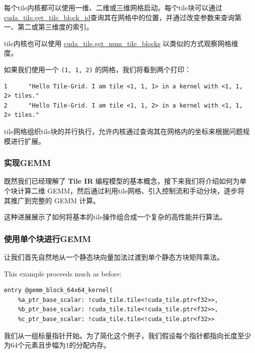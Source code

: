 \documentclass{article}
\begin{document}
每个tile内核都可以使用一维、二维或三维网格启动。每个tile块可以通过\href{https://docs.nvidia.com/cuda/tile-ir/latest/sections/operations.html#op-cuda-tile-get-tile-block-id}{cuda\_tile.get\_tile\_block\_id}查询其在网格中的位置，并通过改变参数来查询第一、第二或第三维度的索引。

tile内核也可以使用 \href{https://docs.nvidia.com/cuda/tile-ir/latest/sections/operations.html#op-cuda-tile-get-num-tile-blocks}{cuda\_tile.get\_num\_tile\_blocks} 以类似的方式观察网格维度。


如果我们使用一个 \texttt{(1, 1, 2)} 的网格，我们将看到两个打印：


\begin{lstlisting}
1      "Hello Tile-Grid. I am tile <1, 1, 1> in a kernel with <1, 1, 2> tiles."
2      "Hello Tile-Grid. I am tile <1, 1, 2> in a kernel with <1, 1, 2> tiles."
\end{lstlisting}

tile网格组织tile块的并行执行，允许内核通过查询其在网格内的坐标来根据问题规模进行扩展。


\subsubsection{实现GEMM}

既然我们已经理解了 \textbf{Tile IR} 编程模型的基本概念，接下来我们将介绍如何为单个块计算二维 GEMM，然后通过利用tile网格、引入控制流和手动分块，逐步将其推广到完整的 GEMM 计算。


这种进展展示了如何将基本的tile操作组合成一个复杂的高性能并行算法。



\subsubsection{使用单个块进行GEMM}

让我们首先自然地从一个静态块向量加法过渡到单个静态方块矩阵乘法。


This example proceeds much as before:


\begin{lstlisting}
entry @gemm_block_64x64_kernel(
    %a_ptr_base_scalar: !cuda_tile.tile<!cuda_tile.ptr<f32>>,
    %b_ptr_base_scalar: !cuda_tile.tile<!cuda_tile.ptr<f32>>,
    %c_ptr_base_scalar: !cuda_tile.tile<!cuda_tile.ptr<f32>>
\end{lstlisting}

我们从一组标量指针开始。为了简化这个例子，我们假设每个指针都指向长度至少为64个元素且步幅为1的分配内存。
\end{document}
